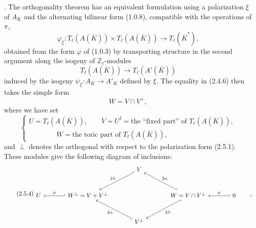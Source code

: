 
\medskip
{}. The orthogonality theorem has an equivalent formulation using a
polarization $\xi$ of $A_K$ and the alternating bilinear form (1.0.8),
compatible with the operations of $\pi$,
\begin{equation}\tag{2.5.1}
 \varphi_\xi:T_\ell(A(\overline K))\times T_\ell(A(\overline K))
 \longrightarrow T_\ell(\overline K^*),
\end{equation}
obtained from the form $\varphi$ of (1.0.3) by transporting structure in
the second argument along the isogeny of $\mathbb Z_\ell$-modules
\[
 T_\ell(A(\overline K))\longrightarrow T_\ell(A'(\overline K))
\]
induced by the isogeny $\psi_\xi:A_K\longrightarrow A'_K$ defined by
$\xi$.  The equality in (2.4.6) then takes the simple form
\begin{equation}\tag{2.5.2}
 W=V\cap V^\perp,
\end{equation}
where we have set
\begin{equation}\tag{2.5.3}
 \left\{
 \begin{array}{l}
 U=T_\ell(A(\overline K)),\qquad
 V=U^I=\text{the ``fixed part'' of }T_\ell(A(\overline K)),\\[2mm]
 \hspace{4em}W=\text{the toric part of }T_\ell(A(\overline K)),
 \end{array}
 \right.
\end{equation}
and $\perp$ denotes the orthogonal with respect to the polarization form
(2.5.1).  These modules give the following diagram of inclusions:
\begin{equation}\tag{2.5.4}
\begin{tikzcd}[column sep=large,row sep=large]
 && V\arrow[dl,hook',"2\lambda"'] && \\
 U & W^\perp=V+V^\perp\arrow[l,hook',"\mu"']
 && W=V\cap V^\perp
    \arrow[ul,hook',"2\alpha"']
    \arrow[dl,hook,"2\lambda"]
 & 0\arrow[l,hook',"\mu"'] \\
 && V^\perp\arrow[ul,hook,"2\alpha"] &&
\end{tikzcd}
\qquad ,
\end{equation}

